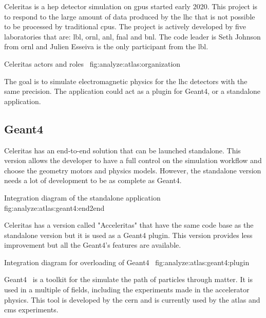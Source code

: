 Celeritas is a \acrfull{hep} detector simulation on \acrshort{gpu}s started
early 2020.
This project is to respond to the large amount of data produced by the
\acrfull{lhc} that is not possible to be processed by traditional
\acrshort{cpu}s.
The project is actively developed by five laboratories that are: \acrfull{lbl},
\acrfull{ornl}, \acrfull{anl}, \acrfull{fnal} and \acrfull{bnl}.
The code leader is Seth Johnson from \acrshort{ornl} and Julien Esseiva is the only
participant from the \acrshort{lbl}.

{Celeritas actors and roles~\cite{celeritas-presentation-johnson}}
{fig:analyze:atlas:organization}

The goal is to simulate electromagnetic physics for the \acrshort{lhc} detectors
with the same precision.
The application could act as a plugin for Geant4, or a standalone application.


\subsection{Geant4}
\label{ch:analyze:atlas:geant4}

Celeritas has an end-to-end solution that can be launched standalone.
This version allows the developer to have a full control on the simulation
workflow and choose the geometry motors and physics models.
However, the standalone version needs a lot of development to be as complete as
Geant4.

{Integration diagram of the standalone application~\cite{celeritas-overview-tognini}}
{fig:analyze:atlas:geant4:end2end}


Celeritas has a version called "Acceleritas" that have the same code base as the
standalone version but it is used as a Geant4 plugin.
This version provides less improvement but all the Geant4's features are available.

    {Integration diagram for overloading of Geant4~\cite{celeritas-overview-tognini}}
    {fig:analyze:atlas:geant4:plugin}

Geant4~\cite{geant4} is a toolkit for the simulate the path of particles through
matter.
It is used in a multiple of fields, including the experiments made in the
accelerator physics.
This tool is developed by the \acrfull{cern} and is currently used by the
\acrfull{atlas} and \acrfull{cms} experiments.



